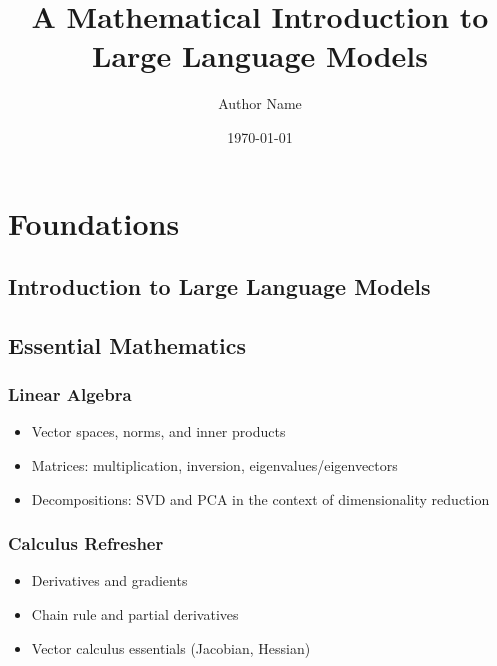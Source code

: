 \documentclass[12pt]{book}
\title{A Mathematical Introduction to Large Language Models}
\author{Author Name}
\date{\today}
\begin{document}
\maketitle

\tableofcontents

\part{Foundations}

\chapter{Introduction to Large Language Models}








\chapter{Essential Mathematics}
\section{Linear Algebra}
\begin{itemize}
    \item Vector spaces, norms, and inner products
    \item Matrices: multiplication, inversion, eigenvalues/eigenvectors
    \item Decompositions: SVD and PCA in the context of dimensionality reduction
\end{itemize}

\section{Calculus Refresher}
\begin{itemize}
    \item Derivatives and gradients
    \item Chain rule and partial derivatives
    \item Vector calculus essentials (Jacobian, Hessian)
\end{itemize}
\end{document}
